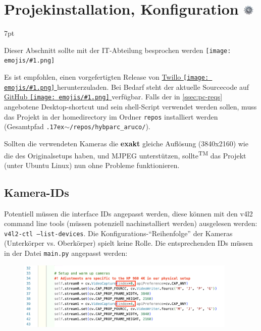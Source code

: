 \documentclass[a4paper, 10pt]{article}
\newcommand{\code}[1]{\texttt{#1}}
\newcommand{\emoji}[1]{
    \begingroup\normalfont
    \texttt{[image: emojis/\#1.png]}
    \endgroup
}
\newcommand{\realtilde}{{\raise.17ex\hbox{$\scriptstyle \mathtt{\sim}$}}}
\newenvironment{tooltip}{%
\small
\vspace*{-4mm}
    \def\FrameCommand{%
    \hspace{1pt}%
    {\color{tooltippipe}\vrule width 0.7mm}%
    {\color{tooltipshade}\vrule width 1.5mm}%
    \colorbox{tooltipshade}%
    }%
    \MakeFramed{\advance\hsize-\width\FrameRestore}%
    \noindent%
    \begin{adjustwidth}{}{7pt}%
    \vspace{2pt}\vspace{2pt}%
}
{%
    \vspace{2pt}\end{adjustwidth}\endMakeFramed%
}
\begin{document}
\section{Projekinstallation, Konfiguration \includegraphics[height=0.65em]{emojis/gear.png}}
\label{sec:installation-configuration}
\begin{tooltip}
    Dieser Abschnitt sollte mit der IT-Abteilung besprochen werden\emoji{technologist}
\end{tooltip}
Es ist empfohlen, einen vorgefertigten Release von \href{https://www.twillo.de/edu-sharing/components/render/1345111e-baf1-4023-b27e-66bcd533de3a}{Twillo\emoji{link}} herunterzuladen. Bei Bedarf steht der aktuelle Sourcecode auf \href{https://github.com/leloomi/hybparc_aruco}{GitHub\emoji{link}} verfügbar. Falls der in \ref{ssec:pc-reqs} angebotene Desktop-shortcut und sein shell-Script verwendet werden sollen, muss das Projekt in der homedirectory im Ordner \code{repos} installiert werden (Gesamtpfad \code{\realtilde/repos/hybparc\_aruco/}).

Sollten die verwendeten Kameras die \textbf{exakt} gleiche Auflösung (3840x2160) wie die des Originalsetups haben, und MJPEG unterstützen, sollte\textsuperscript{\tiny TM} das Projekt (unter Ubuntu Linux) nun ohne Probleme funktionieren. 

\subsection{Kamera-IDs}
\label{ssec:cam-indices}
Potentiell müssen die interface IDs angepasst werden, diese können mit den v4l2 command line tools (müssen potenziell nachinstalliert werden) ausgelesen werden: \code{v4l2-ctl --list-devices}. Die Konfigurations-\enquote{Reihenfolge} der Kameras (Unterkörper vs. Oberkörper) spielt keine Rolle. Die entsprechenden IDs müssen in der Datei \code{main.py} angepasst werden:
\begin{figure}[H]
    \centering
    \includegraphics[width=10.5cm]{camera-indices.png}
\end{figure}
\end{document}
